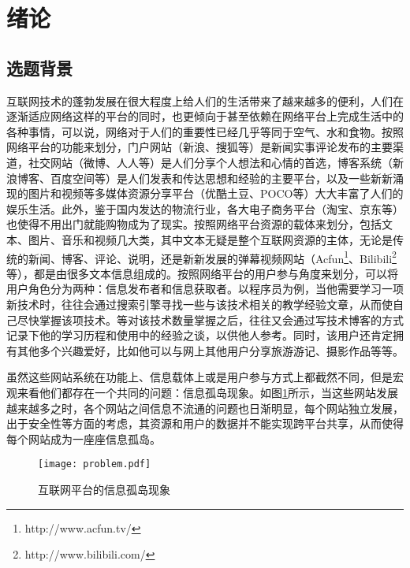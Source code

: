\section{绪论}

\subsection{选题背景}
互联网技术的蓬勃发展在很大程度上给人们的生活带来了越来越多的便利，人们在逐渐适应网络这样的平台的同时，也更倾向于甚至依赖在网络平台上完成生活中的各种事情，可以说，网络对于人们的重要性已经几乎等同于空气、水和食物。按照网络平台的功能来划分，门户网站（新浪、搜狐等）是新闻实事评论发布的主要渠道，社交网站（微博、人人等）是人们分享个人想法和心情的首选，博客系统（新浪博客、百度空间等）是人们发表和传达思想和经验的主要平台，以及一些新新涌现的图片和视频等多媒体资源分享平台（优酷土豆、POCO等）大大丰富了人们的娱乐生活。此外，鉴于国内发达的物流行业，各大电子商务平台（淘宝、京东等）也使得不用出门就能购物成为了现实。按照网络平台资源的载体来划分，包括文本、图片、音乐和视频几大类，其中文本无疑是整个互联网资源的主体，无论是传统的新闻、博客、评论、说明，还是新新发展的弹幕视频网站（Acfun\footnote{http://www.acfun.tv/}、Bilibili\footnote{http://www.bilibili.com/}等），都是由很多文本信息组成的。按照网络平台的用户参与角度来划分，可以将用户角色分为两种：信息发布者和信息获取者。以程序员为例，当他需要学习一项新技术时，往往会通过搜索引擎寻找一些与该技术相关的教学经验文章，从而使自己尽快掌握该项技术。等对该技术数量掌握之后，往往又会通过写技术博客的方式记录下他的学习历程和使用中的经验之谈，以供他人参考。同时，该用户还肯定拥有其他多个兴趣爱好，比如他可以与网上其他用户分享旅游游记、摄影作品等等。

虽然这些网站系统在功能上、信息载体上或是用户参与方式上都截然不同，但是宏观来看他们都存在一个共同的问题：信息孤岛现象。如图\ref{fig:problem}所示，当这些网站发展越来越多之时，各个网站之间信息不流通的问题也日渐明显，每个网站独立发展，出于安全性等方面的考虑，其资源和用户的数据并不能实现跨平台共享，从而使得每个网站成为一座座信息孤岛。

\begin{figure}[ht]
\centering
\texttt{[image: problem.pdf]}
\caption{互联网平台的信息孤岛现象}
\label{fig:problem}
\end{figure}

